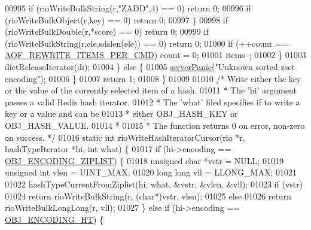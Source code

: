 \begin{DoxyCode}
{{{{{{{{{{{{{{{00995                 \textcolor{keywordflow}{if} (rioWriteBulkString(r,\textcolor{stringliteral}{"ZADD"},4) == 0) \textcolor{keywordflow}{return} 0;
00996                 \textcolor{keywordflow}{if} (rioWriteBulkObject(r,key) == 0) \textcolor{keywordflow}{return} 0;
00997             \}
00998             \textcolor{keywordflow}{if} (rioWriteBulkDouble(r,*score) == 0) \textcolor{keywordflow}{return} 0;
00999             \textcolor{keywordflow}{if} (rioWriteBulkString(r,ele,sdslen(ele)) == 0) \textcolor{keywordflow}{return} 0;
01000             \textcolor{keywordflow}{if} (++count == \hyperlink{server_8h_a437bda3214c8acb2835f49eb68919507}{AOF\_REWRITE\_ITEMS\_PER\_CMD}) count = 0;
01001             items--;
01002         \}
01003         dictReleaseIterator(di);
01004     \} \textcolor{keywordflow}{else} \{
01005         \hyperlink{server_8h_a11cc378e7778a830b41240578de3b204}{serverPanic}(\textcolor{stringliteral}{"Unknown sorted zset encoding"});
01006     \}
01007     \textcolor{keywordflow}{return} 1;
01008 \}
01009 
01010 \textcolor{comment}{/* Write either the key or the value of the currently selected item of a hash.}
01011 \textcolor{comment}{ * The 'hi' argument passes a valid Redis hash iterator.}
01012 \textcolor{comment}{ * The 'what' filed specifies if to write a key or a value and can be}
01013 \textcolor{comment}{ * either OBJ\_HASH\_KEY or OBJ\_HASH\_VALUE.}
01014 \textcolor{comment}{ *}
01015 \textcolor{comment}{ * The function returns 0 on error, non-zero on success. */}
01016 \textcolor{keyword}{static} \textcolor{keywordtype}{int} rioWriteHashIteratorCursor(rio *r, hashTypeIterator *hi, \textcolor{keywordtype}{int} what) \{
01017     \textcolor{keywordflow}{if} (hi->encoding == \hyperlink{server_8h_aabf064ede983103f1fd0df2086e84eee}{OBJ\_ENCODING\_ZIPLIST}) \{
01018         \textcolor{keywordtype}{unsigned} \textcolor{keywordtype}{char} *vstr = NULL;
01019         \textcolor{keywordtype}{unsigned} \textcolor{keywordtype}{int} vlen = UINT\_MAX;
01020         \textcolor{keywordtype}{long} \textcolor{keywordtype}{long} vll = LLONG\_MAX;
01021 
01022         hashTypeCurrentFromZiplist(hi, what, &vstr, &vlen, &vll);
01023         \textcolor{keywordflow}{if} (vstr)
01024             \textcolor{keywordflow}{return} rioWriteBulkString(r, (\textcolor{keywordtype}{char}*)vstr, vlen);
01025         \textcolor{keywordflow}{else}
01026             \textcolor{keywordflow}{return} rioWriteBulkLongLong(r, vll);
01027     \} \textcolor{keywordflow}{else} \textcolor{keywordflow}{if} (hi->encoding == \hyperlink{server_8h_a9c10219f68afc557d510d108257d238b}{OBJ\_ENCODING\_HT}) \{
}}}}}}}}}}}}}}}
\end{DoxyCode}
